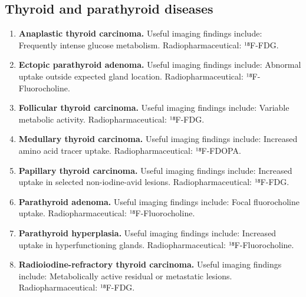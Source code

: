 \subsection{Thyroid and parathyroid diseases}
\begin{enumerate}[leftmargin=*,itemsep=0.45em,topsep=0.4em]
\item \textbf{Anaplastic thyroid carcinoma.} Useful imaging findings include: Frequently intense glucose metabolism. Radiopharmaceutical: ¹⁸F-FDG.
\item \textbf{Ectopic parathyroid adenoma.} Useful imaging findings include: Abnormal uptake outside expected gland location. Radiopharmaceutical: ¹⁸F-Fluorocholine.
\item \textbf{Follicular thyroid carcinoma.} Useful imaging findings include: Variable metabolic activity. Radiopharmaceutical: ¹⁸F-FDG.
\item \textbf{Medullary thyroid carcinoma.} Useful imaging findings include: Increased amino acid tracer uptake. Radiopharmaceutical: ¹⁸F-FDOPA.
\item \textbf{Papillary thyroid carcinoma.} Useful imaging findings include: Increased uptake in selected non-iodine-avid lesions. Radiopharmaceutical: ¹⁸F-FDG.
\item \textbf{Parathyroid adenoma.} Useful imaging findings include: Focal fluorocholine uptake. Radiopharmaceutical: ¹⁸F-Fluorocholine.
\item \textbf{Parathyroid hyperplasia.} Useful imaging findings include: Increased uptake in hyperfunctioning glands. Radiopharmaceutical: ¹⁸F-Fluorocholine.
\item \textbf{Radioiodine-refractory thyroid carcinoma.} Useful imaging findings include: Metabolically active residual or metastatic lesions. Radiopharmaceutical: ¹⁸F-FDG.
\end{enumerate}

